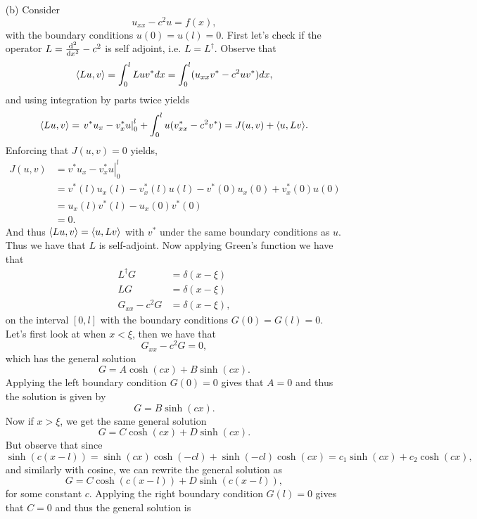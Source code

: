 \documentclass[12pt]{report}
\begin{document}
\begin{solution}
\begin{enumerate}
        
        \item [(b)]
        Consider
        \[ 
            u_{xx} - c^2u = f(x),
        \]
        with the boundary conditions $u(0) = u(l) = 0$. First let's check if the operator $L = \frac{\mathrm{d}^{2} }{\mathrm{d} x^{2}} - c^2$ is self adjoint, i.e. $L = L^\dag$. Observe that
        \begin{align*}
            {\left\langle Lu,v\right\rangle} = \int_0^l Lu v^* dx = \int_0^l (u_{xx} v^* - c^2 u v^*)dx,
        \end{align*}
        and using integration by parts twice yields
        \[ 
            {\left\langle Lu,v\right\rangle} = \left. v^*u_x - v_x^*u\right|^l_0 + \int_0^l u(v^*_{xx} - c^2v^*)= J(u,v) + {\left\langle u,Lv\right\rangle}.
        \]
        Enforcing that $J(u,v) = 0$ yields,
        \begin{align*}
            J(u,v) &= \left. v^*u_x - v_x^*u\right|^l_0\\
            &= v^*(l)u_x(l) - v_x^*(l)u(l) - v^*(0)u_x(0) + v^*_x(0)u(0)\\
            &= u_x(l) v^*(l) - u_x(0)v^*(0)\\
            &= 0.
        \end{align*} 
        And thus ${\left\langle Lu,v\right\rangle} = {\left\langle u,Lv\right\rangle}$ with $v^*$ under the same boundary conditions as $u$. Thus we have that $L$ is self-adjoint. Now applying Green's function we have that
        \begin{align*}
            L^\dag G &= \delta(x - \xi)\\
            LG &= \delta(x - \xi)\\
            G_{xx} - c^2 G &= \delta(x - \xi),
        \end{align*}
        on the interval $[0,l]$ with the boundary conditions $G(0)=G(l)=0.$
        Let's first look at when $x < \xi$, then we have that
        \[ 
            G_{xx} - c^2 G = 0,
        \]
        which has the general solution
        \[ 
            G = A\cosh(cx) + B \sinh(cx).
        \]
        Applying the left boundary condition $G(0) = 0$ gives that $A=0$ and thus the solution is given by
        \[ 
            G = B\sinh(cx).
        \]
        Now if $x > \xi$, we get the same general solution 
        \[ 
            G = C\cosh(cx) + D\sinh(cx).
        \]
        But observe that since
        \[ 
            \sinh(c(x - l)) = \sinh(cx)\cosh(-cl) + \sinh(-cl)\cosh(cx) = c_1\sinh(cx) + c_2\cosh(cx),
        \]
        and similarly with cosine, we can rewrite the general solution as
        \[ 
            G = C \cosh(c(x - l)) + D \sinh(c(x - l)),
        \]
        for some constant $c$. Applying the right boundary condition $G(l) = 0$ gives that $C = 0$ and thus the general solution is

\end{enumerate}
\end{solution}
\end{document}
